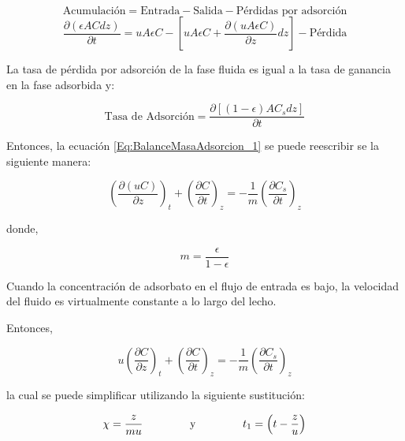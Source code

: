 \documentclass[11pt]{book}
\begin{document}
\begin{equation*}
    \textrm{Acumulación} = \textrm{Entrada} - \textrm{Salida} - \textrm{Pérdidas por adsorción}
\end{equation*}
\begin{equation}
    \label{Eq:BalanceMasaAdsorcion_1}
    \frac{\partial (\epsilon A C dz)}{\partial t} = u A \epsilon C - \left[ u A \epsilon C + \frac{\partial (u A \epsilon C)}{\partial z} dz\right] - \textrm{Pérdida}
\end{equation}

La tasa de pérdida por adsorción de la fase fluida es igual a la tasa de ganancia en la fase adsorbida y:

\begin{equation*}
    \textrm{Tasa de Adsorción} = \frac{\partial [(1-\epsilon) A C_s dz]}{\partial t}
\end{equation*}

Entonces, la ecuación \ref{Eq:BalanceMasaAdsorcion_1} se puede reescribir se la siguiente manera:

\begin{equation}
    \label{Eq:BalanceMasaAdsorcion_2}
    \left( \frac{\partial (u C)}{\partial z} \right)_t + \left( \frac{\partial C}{\partial t} \right)_z = - \frac{1}{m} \left( \frac{\partial C_s}{\partial t} \right)_z
\end{equation}

donde,

\begin{equation*}
    m = \frac{\epsilon}{1-\epsilon}
\end{equation*}

Cuando la concentración de adsorbato en el flujo de entrada es bajo, la velocidad del fluido es virtualmente constante a lo largo del lecho.

Entonces,

\begin{equation}
    \label{Eq:BalanceMasaAdsorcion_2_b}
    u \left( \frac{\partial C}{\partial z} \right)_t + \left( \frac{\partial C}{\partial t} \right)_z = - \frac{1}{m} \left( \frac{\partial C_s}{\partial t} \right)_z
\end{equation}

la cual se puede simplificar utilizando la siguiente sustitución:

\begin{equation*}
    \chi = \frac{z}{mu} \hspace{1.5cm} \textrm{y} \hspace{1.5cm} t_1 = \left( t - \frac{z}{u} \right)
\end{equation*}
\end{document}
